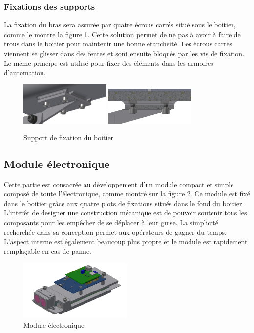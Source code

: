 \subsubsection{Fixations des supports}

La fixation du bras sera assurée par quatre écrous carrés situé sous le boitier, comme le montre la figure 
\ref{fig:supportfix}. Cette solution permet de 
ne pas à avoir à faire de trous dans le boitier pour maintenir une bonne étanchéité. Les écrous carrés viennent
se glisser dans des fentes et sont ensuite bloqués par les vis de fixation. Le même principe est utilisé pour 
fixer des éléments dans les armoires d'automation.

\begin{figure}[H]
    \centering
    \includegraphics[width=0.4\textwidth]{Images/photos_PGA/fixdessous2.PNG}
    \includegraphics[width=0.4\textwidth]{Images/photos_PGA/écroucarré.PNG}
    \caption{Support de fixation du boitier}
    \label{fig:supportfix}
\end{figure}

\subsection{Module électronique}

Cette partie est consacrée au développement d’un module compact et simple composé de toute l'électronique, 
comme montré sur la figure \ref{fig:elmodule}.
Ce module est fixé dans le boitier grâce aux quatre plots de fixations situés dans le fond 
du boitier. L’interêt de designer une construction mécanique est de pouvoir soutenir tous les composants 
pour les empêcher de se déplacer à leur guise. La simplicité recherchée dans sa conception permet
aux opérateurs de gagner du temps. L'aspect interne est également beaucoup plus propre et le module est
rapidement remplaçable en cas de panne.

\begin{figure}[H]
    \centering
    \includegraphics[width=0.5\textwidth]{Images/photos_PGA/ModuleElec2-removebg-preview.png}
    \caption{Module électronique}
    \label{fig:elmodule}
\end{figure}

